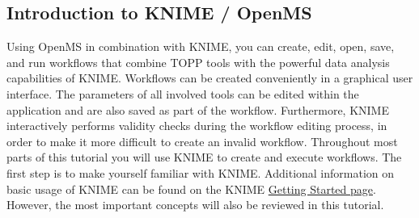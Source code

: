 
\subsection{Introduction to KNIME / OpenMS}
\label{KNIME_Intro}

Using OpenMS in combination with KNIME, you can create, edit, open, save, and run workflows
that combine TOPP tools with the powerful data analysis capabilities of KNIME. Workflows can
be created conveniently in a graphical user interface. The parameters of all involved
tools can be edited within the application and are also saved as part of the workflow.
Furthermore, KNIME interactively performs validity checks during the workflow editing
process, in order to make it more difficult to create an invalid workflow.
\newline
\noindent Throughout most parts of this tutorial you will use KNIME to create and
execute workflows. The first step is to make yourself familiar with KNIME. Additional
information on basic usage of KNIME can be found on the KNIME
\href{https://tech.knime.org/knime}{Getting Started page}. However,
the most important concepts will also be reviewed in this tutorial.

